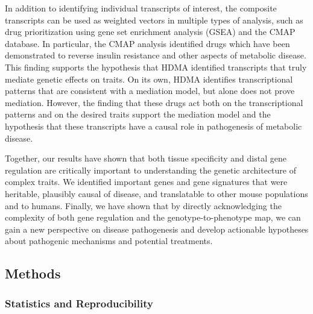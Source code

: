 \documentclass[
]{article}
\begin{document}
In addition to identifying individual transcripts of interest, the
composite transcripts can be used as weighted vectors in multiple types
of analysis, such as drug prioritization using gene set enrichment
analysis (GSEA) and the CMAP database. In particular, the CMAP analysis
identified drugs which have been demonstrated to reverse insulin
resistance and other aspects of metabolic disease. This finding supports
the hypothesis that HDMA identified transcripts that truly mediate
genetic effects on traits. On its own, HDMA identifies transcriptional
patterns that are consistent with a mediation model, but alone does not
prove mediation. However, the finding that these drugs act both on the
transcriptional patterns and on the desired traits support the mediation
model and the hypothesis that these transcripts have a causal role in
pathogenesis of metabolic disease.

Together, our results have shown that both tissue specificity and distal
gene regulation are critically important to understanding the genetic
architecture of complex traits. We identified important genes and gene
signatures that were heritable, plausibly causal of disease, and
translatable to other mouse populations and to humans. Finally, we have
shown that by directly acknowledging the complexity of both gene
regulation and the genotype-to-phenotype map, we can gain a new
perspective on disease pathogenesis and develop actionable hypotheses
about pathogenic mechanisms and potential treatments.

\subsection{Methods}\label{methods}

\subsubsection{Statistics and
Reproducibility}\label{statistics-and-reproducibility}
\end{document}
